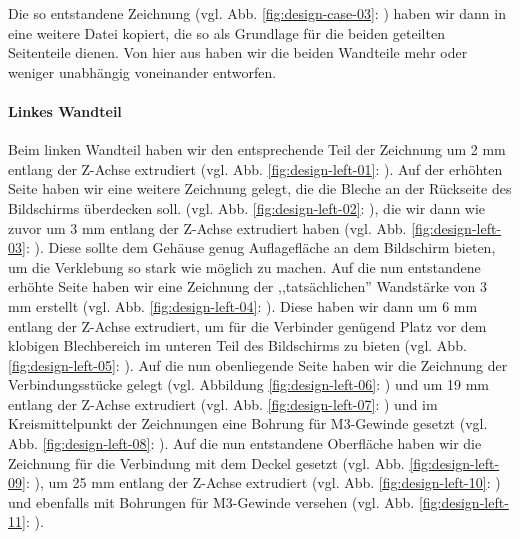 \noindent Die so entstandene Zeichnung (vgl. Abb. \ref{fig:design-case-03}: ) haben wir dann in eine weitere Datei kopiert, die so als Grundlage für die beiden geteilten Seitenteile dienen. 
Von hier aus haben wir die beiden Wandteile mehr oder weniger unabhängig voneinander entworfen.\par
\paragraph{Linkes Wandteil}
Beim linken Wandteil haben wir den entsprechende Teil der Zeichnung um 2 mm entlang der Z-Achse extrudiert (vgl. Abb. \ref{fig:design-left-01}: ). 
Auf der erhöhten Seite haben wir eine weitere Zeichnung gelegt, die die Bleche an der Rückseite des Bildschirms überdecken soll. (vgl. Abb. \ref{fig:design-left-02}: ), die wir dann wie zuvor um 3 mm entlang der Z-Achse extrudiert haben (vgl. Abb. \ref{fig:design-left-03}: ). 
Diese sollte dem Gehäuse genug Auflagefläche an dem Bildschirm bieten, um die Verklebung so stark wie möglich zu machen. 
Auf die nun entstandene erhöhte Seite haben wir eine Zeichnung der ,,tatsächlichen'' Wandstärke von 3 mm erstellt (vgl. Abb. \ref{fig:design-left-04}: ). 
Diese haben wir dann um 6 mm entlang der Z-Achse extrudiert, um für die Verbinder genügend Platz vor dem klobigen Blechbereich im unteren Teil des Bildschirms zu bieten (vgl. Abb.  \ref{fig:design-left-05}: ). 
Auf die nun obenliegende Seite haben wir die Zeichnung der Verbindungsstücke gelegt (vgl. Abbildung \ref{fig:design-left-06}: ) und um 19 mm entlang der Z-Achse extrudiert (vgl. Abb. \ref{fig:design-left-07}: ) und im Kreismittelpunkt der Zeichnungen eine Bohrung für M3-Gewinde gesetzt (vgl. Abb. \ref{fig:design-left-08}: ). 
Auf die nun  entstandene Oberfläche haben wir die Zeichnung für die Verbindung mit dem Deckel gesetzt (vgl. Abb. \ref{fig:design-left-09}: ), um 25 mm entlang der Z-Achse extrudiert (vgl. Abb. \ref{fig:design-left-10}: ) und ebenfalls mit Bohrungen für M3-Gewinde versehen (vgl. Abb. \ref{fig:design-left-11}: ).\par
